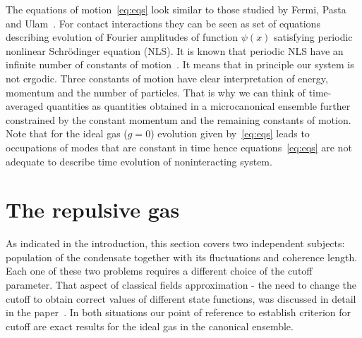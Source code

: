 \documentclass[aps,pra,reprint]{revtex4-2}
\begin{document}
The equations of motion~\eqref{eq:eqs} look similar to those studied by Fermi, 
Pasta and Ulam~\cite{Fermi1955}. For contact interactions they can be seen as 
set of equations describing evolution of Fourier amplitudes of function 
$\psi(x)$ satisfying periodic nonlinear Schr{\"o}dinger equation (NLS). It is 
known that periodic NLS have an infinite number of constants of 
motion~\cite{Faddeev2007}. It means that in principle our system is not 
ergodic. Three constants of motion have clear interpretation of energy, 
momentum and the number of particles. That is why we can think of time-averaged 
quantities as quantities obtained in a microcanonical ensemble further 
constrained by the constant momentum and the remaining constants of motion. 
Note that for the ideal gas ($g=0$) evolution given by~\eqref{eq:eqs} leads to 
occupations of modes that are constant in time hence equations~\eqref{eq:eqs} 
are not adequate to describe time evolution of noninteracting system.

\section{The repulsive gas}\label{repulsive}
As indicated in the introduction, this section covers two independent subjects: 
population of the condensate together with its fluctuations and coherence 
length. Each one of these two problems requires a different choice of the 
cutoff parameter. That aspect of classical fields approximation - the need to 
change the cutoff to obtain correct values of different state functions, was 
discussed in detail in the paper~\cite{Pietraszewicz2018}.  In both situations 
our point of reference to establish criterion for cutoff are exact results for 
the ideal gas in the canonical ensemble.
\end{document}
